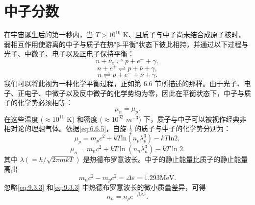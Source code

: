 \section{中子分数}\label{ux4e2dux5b50ux5206ux6570}
在宇宙诞生后的第一秒内，当 \(T > 10^{10}\) K、且质子与中子尚未结合成原子核时，弱相互作用使游离的中子与质子在热"β-平衡"状态下彼此相持，并通过以下过程与光子、中微子、电子以及正电子保持平衡：
\begin{equation}\tag{9.4.1}\label{eq:9.4.1}
n + \nu _ { e } \rightleftharpoons p + e ^{-} + \gamma ,
\end{equation}
\begin{equation}\tag{9.4.2}\label{eq:9.4.2}
n + e ^{+} \rightleftharpoons p + \bar { \nu } + \gamma ,
\end{equation}
\begin{equation}\tag{9.4.3}\label{eq:9.4.3}
n \rightleftharpoons p + e ^{-} + \bar { \nu } + \gamma .
\end{equation}
我们可以将此视为一种化学平衡过程，正如第 6.6 节所描述的那样。由于光子、电子、正电子、中微子以及反中微子的化学势均为零，因此在平衡状态下，中子与质子的化学势必须相等：
\begin{equation}\tag{9.4.4}\label{eq:9.4.4}
\mu _ { n } = \mu _ { p } .
\end{equation}
在这些温度 (\(\approx 10^{11}\) K) 和密度 (\(\approx 10^{32}\) \(m^{-3}\)) 下，质子与中子可以被视作经典非相对论的理想气体。依据\autoref{eq:6.6.5}，自旋 \(\frac{1}{2}\) 的质子与中子的化学势分别为：
\begin{equation}\tag{9.4.5}\label{eq:9.4.5}
\mu _ { p } = m _ { p } c ^{2} + k T \mathrm { l n } \left( n _ { p } \lambda _ { p } ^{3} \right) - k T \mathrm { l n } 2 ,
\end{equation}
\begin{equation}\tag{9.4.6}\label{eq:9.4.6}
\mu _ { n } = m _ { n } c ^{2} + k T \ln \left( n _ { n } \lambda _ { n } ^{3} \right) - k T \ln 2 .
\end{equation}
其中 \(\lambda(=h/\sqrt{2\pi mkT})\) 是热德布罗意波长。中子的静止能量比质子的静止能量高出
\begin{equation}\tag{9.4.7}\label{eq:9.4.7}
m _ { n } c ^{2} - m _ { p } c ^{2} = \Delta \varepsilon = 1 . 29 3 \mathrm { M e V } .
\end{equation}
忽略\autoref{eq:9.3.3} 和\autoref{eq:9.3.3} 中热德布罗意波长的微小质量差异，可得
\begin{equation}\tag{9.4.8}\label{eq:9.4.8}
n _ { n } = n _ { p } e ^{- \beta \Delta \varepsilon} .
\end{equation}
